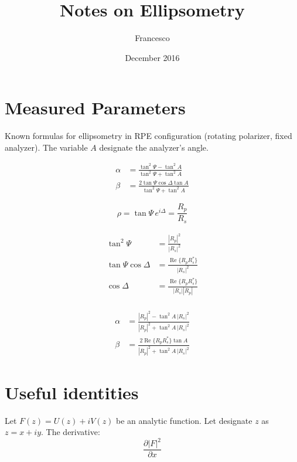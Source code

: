 \documentclass{article}
\title{Notes on Ellipsometry}
\author{Francesco}
\date{December 2016}
\begin{document}
\section{Measured Parameters}
Known formulas for ellipsometry in RPE configuration (rotating polarizer, fixed analyzer). The variable $A$ designate the analyzer's angle.

\begin{align}
    \alpha & = \frac{\tan^2 \Psi - \tan^2 A}{\tan^2 \Psi + \tan^2 A} \\
    \beta & = \frac{2 \tan \Psi \cos \Delta \tan A}{\tan^2 \Psi + \tan^2 A}
\end{align}

\begin{equation}
    \rho = \tan \Psi \, e^{i \Delta} = \frac{R_p}{R_s}
\end{equation}

\begin{align*}
     \tan^2 \Psi & = \frac{|R_p|^2}{|R_s|^2} \\
     \tan \Psi \cos \Delta & = \frac{\operatorname{Re}\{R_p R_s^\ast\}}{|R_s|^2} \\
     \cos \Delta & = \frac{\operatorname{Re}\{R_p R_s^\ast\}}{|R_s| |R_p|} \\
\end{align*}

\begin{align}
    \alpha & = \frac{|R_p|^2 - \tan^2 A \, |R_s|^2}{|R_p|^2 + \tan^2 A \, |R_s|^2} \\
    \beta & = \frac{2 \operatorname{Re}\{R_p R_s^\ast\} \tan A}{|R_p|^2 + \tan^2 A \, |R_s|^2}
\end{align}

\section{Useful identities}

Let $F(z) = U(z) + i V(z)$ be an analytic function. Let designate $z$ as $z = x + i y$. The derivative:
\begin{equation*}
    \frac{\partial |F|^2}{\partial x}
\end{equation*}
\end{document}
